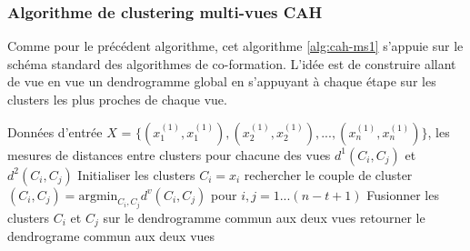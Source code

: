 \documentclass[12pt, french, latin.medieval, a4paper]{report}
\begin{document}
        	\subsubsection{Algorithme de clustering multi-vues CAH}
            	Comme pour le précédent algorithme, cet algorithme \ref{alg:cah-ms1} s'appuie sur le schéma standard des algorithmes de co-formation.
            	L'idée est de construire allant de vue en vue un dendrogramme global en s'appuyant à chaque étape sur les clusters les plus proches de chaque vue.
            	\begin{algorithm}[H]
                	\caption{Pseudo code de l'algorithme multi-vues CAH \cite{bickel2004multi}}
                	\label{alg:cah-ms1}
                	\begin{algorithmic}[1]
                	\REQUIRE Données d'entrée $X$ = $\{ (x_{1}^{(1)}, x_{1}^{(1)}), (x_{2}^{(1)}, x_{2}^{(1)}), ..., (x_{n}^{(1)}, x_{n}^{(1)}) \}$, les mesures de distances entre clusters pour chacune des vues $d^1(C_i,C_j)$ et $d^2(C_i,C_j)$
                	\STATE Initialiser les clusters $C_i = x_i$
                        	\STATE rechercher le couple de cluster $(C_i, C_j)= \text{argmin}_{C_i,C_j} d^v(C_i, C_j)$ pour $i,j = 1...(n-t+1)$
                        	\STATE Fusionner les clusters $C_i$ et $C_j$ sur le dendrogramme commun aux deux vues
                    	\ENDFOR
                	\ENDFOR
                	\STATE retourner le dendrograme commun aux deux vues
                	\end{algorithmic}
            	\end{algorithm}
       	 
\end{document}
